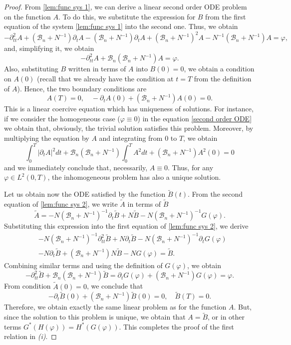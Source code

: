 \documentclass[10pt,a4paper]{amsart}
\numberwithin{equation}{section}
\begin{document}
\begin{proof}
From \eqref{lem:func sys 1}, we can derive a linear second order
ODE problem on the function $A$. To do this, we substitute the expression
for $B$ from the first equation of the system \eqref{lem:func sys 1} into
the second one. Thus, we obtain
\[
-\partial _{tt}^2A+(\mathcal{B}_n+N^{-1})\partial _{t}A-(\mathcal{B}%
_n+N^{-1})\partial _{t}A+(\mathcal{B}_n+N^{-1})^2A-N^{-1}(\mathcal{B}%
_n+N^{-1})A=\varphi ,
\]%
and, simplifying it, we obtain
\begin{equation}
-\partial _{tt}^2A+\mathcal{B}_n(\mathcal{B}_n+N^{-1})A=\varphi .
\label{second order ODE}
\end{equation}%
Also, substituting $B$ written in terms of $A$ into $B(0)=0$, we obtain a
condition on $A(0)$ (recall that we already have the condition at $t=T$ from
the definition of $A$). Hence, the two boundary conditions are
\begin{equation}
A(T)=0,\quad -\partial _{t}A(0)+(\mathcal{B}_n+N^{-1})A(0)=0.
\label{bound cond ODE}
\end{equation}
This is a linear coercive equation which has uniqueness of solutions. For
instance, if we consider the homogeneous case ($\varphi \equiv 0$) in the
equation \eqref{second order ODE} we obtain that, obviously, the trivial
solution satisfies this problem. Moreover, by multiplying the equation by $A$
and integrating from $0$ to $T$, we obtain
\[
\int _0^{T}|\partial _{t}A|^2{dt}+\mathcal{B}_n(\mathcal{B}%
_n+N^{-1})\int _0^{T}A^2{dt}+(\mathcal{B}_n+N^{-1})A^2(0)=0
\]
and we immediately conclude that, necessarily, $A\equiv 0$. Thus, for any
$\varphi \in L^2(0,T)$, the inhomogeneous problem has also a unique
solution.

Let us obtain now the ODE satisfied by the function $\tilde{B}(t)$. From the
second equation of \eqref{lem:func sys 2}, we write $\tilde{A}$ in terms of 
$\tilde{B}$
\[
\tilde{A}=-N(\mathcal{B}_n+N^{-1})^{-1}\partial _{t}\tilde{B}+N\tilde{B}-N(%
\mathcal{B}_n+N^{-1})^{-1}G(\varphi ).
\]
Substituting this expression into the first equation of
\eqref{lem:func sys 2}, we derive
\begin{align*}
&-N(\mathcal{B}_n+N^{-1})^{-1}\partial _{tt}^2\tilde{B}+N\partial _{t}%
\tilde{B}-N(\mathcal{B}_n+N^{-1})^{-1}\partial _{t}G(\varphi ) \\
&-N\partial _{t}\tilde{B}+(\mathcal{B}_n+N^{-1})N\tilde{B}-NG(\varphi )=%
\tilde{B}.
\end{align*}
Combining similar terms and using the definition of $G(\varphi )$, we obtain
\[
-\partial _{tt}^2\tilde{B}+\mathcal{B}_n(\mathcal{B}_n+N^{-1})\tilde{B}%
=\partial _{t}G(\varphi )+(\mathcal{B}_n+N^{-1})G(\varphi )=\varphi .
\]
From condition $\tilde{A}(0)=0$, we conclude that
\[
-\partial _{t}\tilde{B}(0)+(\mathcal{B}_n+N^{-1})\tilde{B}(0)=0,\quad
\tilde{B}(T)=0.
\]
Therefore, we obtain exactly the same linear problem as for the function $A$.
But, since the solution to this problem is unique, we obtain that $A=\tilde{B}$,
or in other terms $G^{\ast }(H(\varphi ))=H^{\ast }(G(\varphi ))$. This
completes the proof of the first relation in \textit{(i)}.


\end{proof}
\end{document}
